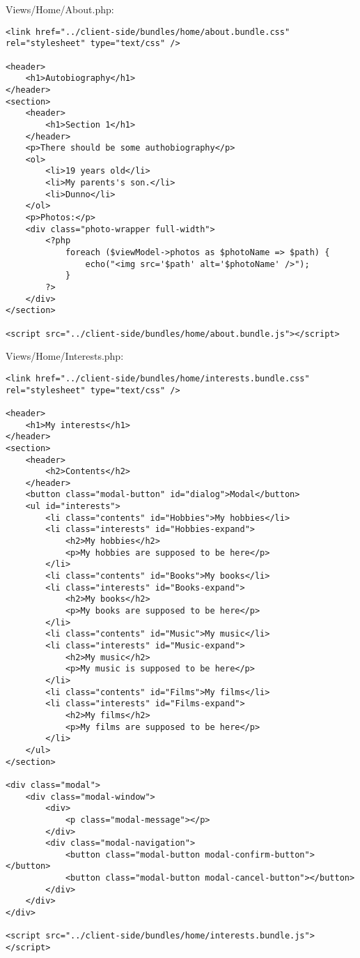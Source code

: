 \documentclass[a4paper,14pt]{extarticle}
\begin{document}
Views/Home/About.php:
\begin{lstlisting}
<link href="../client-side/bundles/home/about.bundle.css" rel="stylesheet" type="text/css" />

<header>
    <h1>Autobiography</h1>
</header>
<section>
    <header>
        <h1>Section 1</h1>
    </header>
    <p>There should be some authobiography</p>
    <ol>
        <li>19 years old</li>
        <li>My parents's son.</li>
        <li>Dunno</li>
    </ol>
    <p>Photos:</p>
    <div class="photo-wrapper full-width">
        <?php
            foreach ($viewModel->photos as $photoName => $path) {
                echo("<img src='$path' alt='$photoName' />");
            }
        ?>
    </div>
</section>

<script src="../client-side/bundles/home/about.bundle.js"></script>
\end{lstlisting}

Views/Home/Interests.php:
\begin{lstlisting}
<link href="../client-side/bundles/home/interests.bundle.css" rel="stylesheet" type="text/css" />

<header>
    <h1>My interests</h1>
</header>
<section>
    <header>
        <h2>Contents</h2>
    </header>
    <button class="modal-button" id="dialog">Modal</button>
    <ul id="interests">
        <li class="contents" id="Hobbies">My hobbies</li>
        <li class="interests" id="Hobbies-expand">
            <h2>My hobbies</h2>
            <p>My hobbies are supposed to be here</p>
        </li>
        <li class="contents" id="Books">My books</li>
        <li class="interests" id="Books-expand">
            <h2>My books</h2>
            <p>My books are supposed to be here</p>
        </li>
        <li class="contents" id="Music">My music</li>
        <li class="interests" id="Music-expand">
            <h2>My music</h2>
            <p>My music is supposed to be here</p>
        </li>
        <li class="contents" id="Films">My films</li>
        <li class="interests" id="Films-expand">
            <h2>My films</h2>
            <p>My films are supposed to be here</p>
        </li>
    </ul>
</section>

<div class="modal">
    <div class="modal-window">
        <div>
            <p class="modal-message"></p>
        </div>
        <div class="modal-navigation">
            <button class="modal-button modal-confirm-button"></button>
            <button class="modal-button modal-cancel-button"></button>
        </div>
    </div>
</div>

<script src="../client-side/bundles/home/interests.bundle.js"></script>
\end{lstlisting}
\end{document}
